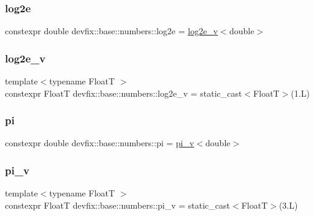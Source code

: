 \subsubsection{\texorpdfstring{log2e}{log2e}}
{\footnotesize\ttfamily constexpr double devfix\+::base\+::numbers\+::log2e = \hyperlink{namespacedevfix_1_1base_1_1numbers_ae6f0f450df0456294f5cda7ff81aaf75}{log2e\+\_\+v}$<$double$>$}

\mbox{\label{namespacedevfix_1_1base_1_1numbers_ae6f0f450df0456294f5cda7ff81aaf75}} 
\subsubsection{\texorpdfstring{log2e\+\_\+v}{log2e\_v}}
{\footnotesize\ttfamily template$<$typename FloatT $>$ \\
constexpr FloatT devfix\+::base\+::numbers\+::log2e\+\_\+v = static\+\_\+cast$<$FloatT$>$(1.\+L)}

\mbox{\label{namespacedevfix_1_1base_1_1numbers_a4d453d2292be52311d9a508a0d5817d1}} 
\subsubsection{\texorpdfstring{pi}{pi}}
{\footnotesize\ttfamily constexpr double devfix\+::base\+::numbers\+::pi = \hyperlink{namespacedevfix_1_1base_1_1numbers_a5dc03b283872fcc39e2b3c4bacbaa40d}{pi\+\_\+v}$<$double$>$}

\mbox{\label{namespacedevfix_1_1base_1_1numbers_a5dc03b283872fcc39e2b3c4bacbaa40d}} 
\subsubsection{\texorpdfstring{pi\+\_\+v}{pi\_v}}
{\footnotesize\ttfamily template$<$typename FloatT $>$ \\
constexpr FloatT devfix\+::base\+::numbers\+::pi\+\_\+v = static\+\_\+cast$<$FloatT$>$(3.\+L)}

